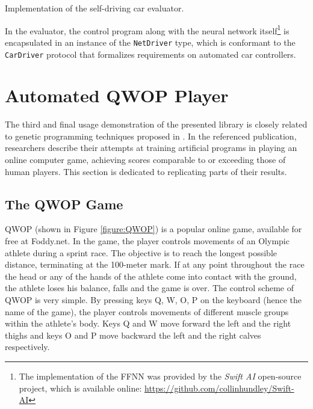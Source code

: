 \begin{listing}[ht]
	\caption{Implementation of the self-driving car evaluator.}
	\label{listing:evaluator-sequential-car}
\end{listing}

In the evaluator, the control program along with the neural network itself\footnote{The implementation of the FFNN was provided by the \textit{Swift AI} open-source project, which is available online: \url{https://github.com/collinhundley/Swift-AI}} is encapsulated in an instance of the \texttt{NetDriver} type, which is conformant to the \texttt{CarDriver} protocol that formalizes requirements on automated car controllers.

\todo %

\section{Automated QWOP Player}
The third and final usage demonstration of the presented library is closely related to genetic programming techniques proposed in \cite{EvolvingQwopGaits}. In the referenced publication, researchers describe their attempts at training artificial programs in playing an online computer game, achieving scores comparable to or exceeding those of human players. This section is dedicated to replicating parts of their results.

\subsection{The QWOP Game}
QWOP (shown in Figure \ref{figure:QWOP}) is a popular online game, available for free at Foddy.net. \cite{QwopWebsite} In the game, the player controls movements of an Olympic athlete during a sprint race. The objective is to reach the longest possible distance, terminating at the 100-meter mark. If at any point throughout the race the head or any of the hands of the athlete come into contact with the ground, the athlete loses his balance, falls and the game is over. The control scheme of QWOP is very simple. By pressing keys Q, W, O, P on the keyboard (hence the name of the game), the player controls movements of different muscle groups within the athlete's body. Keys Q and W move forward the left and the right thighs and keys O and P move backward the left and the right calves respectively.

